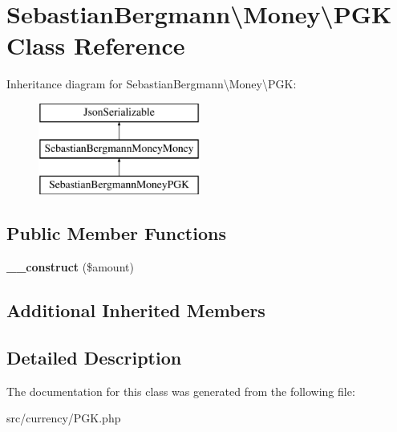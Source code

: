 \hypertarget{classSebastianBergmann_1_1Money_1_1PGK}{}\section{Sebastian\+Bergmann\textbackslash{}Money\textbackslash{}P\+G\+K Class Reference}
\label{classSebastianBergmann_1_1Money_1_1PGK}
Inheritance diagram for Sebastian\+Bergmann\textbackslash{}Money\textbackslash{}P\+G\+K\+:\begin{figure}[H]
\begin{center}
\leavevmode
\includegraphics[height=3.000000cm]{classSebastianBergmann_1_1Money_1_1PGK}
\end{center}
\end{figure}
\subsection*{Public Member Functions}
\begin{DoxyCompactItemize}
\item 
\hypertarget{classSebastianBergmann_1_1Money_1_1PGK_a2fc86929de8b957f8f44c2b8530b0c76}{}{\bfseries \+\_\+\+\_\+construct} (\$amount)\label{classSebastianBergmann_1_1Money_1_1PGK_a2fc86929de8b957f8f44c2b8530b0c76}

\end{DoxyCompactItemize}
\subsection*{Additional Inherited Members}


\subsection{Detailed Description}


The documentation for this class was generated from the following file\+:\begin{DoxyCompactItemize}
\item 
src/currency/P\+G\+K.\+php\end{DoxyCompactItemize}
